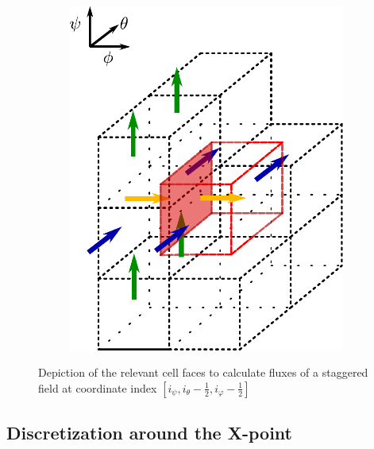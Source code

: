 \begin{figure}[H]
\begin{subfigure}[b]{0.24\textwidth}
		\includegraphics[width=1\textwidth]{schemes/BoundingBoxFluxPhiDiffPerp.pdf}
		\label{fig:StaggeredFluxPhi}
	\end{subfigure}
	
	\caption{Depiction of the relevant cell faces to calculate fluxes of a staggered field at coordinate index $[i_\psi, i_\theta-\frac{1}{2}, i_\varphi-\frac{1}{2}]$}
	\label{fig:StaggeredPerpendicularLaplancianCellSurfaces}
\end{figure}





\subsection{Discretization around the X-point}
\label{ssec:DiscretizationXPt}

